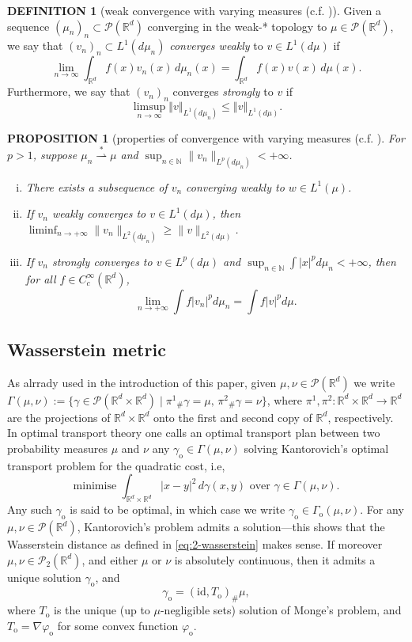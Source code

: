 \documentclass[11pt,leqno]{amsart}
\newtheorem{prop}[thm]{PROPOSITION}
\theoremstyle{definition}
\newtheorem{defi}[thm]{DEFINITION}
\newcommand{\bes}{\begin{equation*}}
\newcommand{\ees}{\end{equation*}}
\newcommand{\norm}[1]{\left\Vert#1\right\Vert}
\newcommand{\R}{{\mathord{\mathbb R}}}
\newcommand{\Rd}{{\mathord{\mathbb R}^d}}
\newcommand{\grad}{\nabla}
\newcommand{\wsto}{\stackrel{*}{\rightharpoonup}}
\def\P{{\mathcal P}}
\newcommand{\ird}{\int_{\mathord{\mathbb R}^d}}
\begin{document}
\begin{defi}[weak convergence with varying measures {(c.f. \cite[Definition 5.4.3]{AGS})}] \label{weakvaryingdef}
Given a sequence $(\mu_n)_n \subset \P(\Rd)$ converging in the weak-* topology to $\mu \in \P(\Rd)$, we say that $(v_n)_n \subset L^1(d \mu_n)$ \emph{converges weakly} to $v \in L^1(d \mu)$ if 
\bes
	\lim_{n\to\infty} \ird f(x) v_n(x) \,d\mu_n(x) = \ird f(x) v(x) \,d\mu(x).
\ees
Furthermore, we say that $(v_n)_n$ converges \emph{strongly} to $v$ if 
\bes
	\limsup_{n\to\infty} \norm{v}_{L^1(d\mu_n)} \leq \norm{v}_{L^1(d\mu)}.
\ees
\end{defi}

\begin{prop}[properties of convergence with varying measures {(c.f. \cite[Theorem 5.4.4]{AGS}}] \label{AGSthm}
For $p>1$, suppose $\mu_n \wsto \mu$ and  $\sup_{n \in \mathbb{N}} \| v_n\|_{L^p(d \mu_n)} <+\infty$.
\begin{enumerate}[(i)]
\item There exists a subsequence of $v_n$ converging weakly to $w \in L^1(\mu)$. \label{weakcpt}
\item If $v_n$ weakly converges to $v \in L^1(d \mu)$, then $\liminf_{n \to +\infty} \|v_n\|_{L^2(d \mu_n)} \geq \|v\|_{L^2(d \mu)}$. \label{weaklsc}
\item If $v_n$ strongly converges to $v \in L^p(d \mu)$ and $\sup_{n \in \mathbb{N}} \int |x|^p d \mu_n <+\infty$, then for all $f \in C^\infty_c(\Rd)$,
\[ \lim_{n \to +\infty} \int f |v_n|^p d \mu_n = \int f |v|^p d \mu . \] \label{strongcty}
\end{enumerate}
\end{prop}
\subsection{Wasserstein metric}

As alrrady used in the introduction of this paper, given $\mu,\nu\in\P(\R^d)$ we write $\Gamma(\mu,\nu) := \{\gamma \in\P(\R^d\times\R^d) \mid {\pi^1}_\# \gamma = \mu,\, {\pi^2}_\# \gamma = \nu\}$, where $\pi^1,\pi^2\colon \R^d \times \R^d \to \R^d$ are the projections of $\R^d\times \R^d$ onto the first and second copy of $\R^d$, respectively. In optimal transport theory one calls an optimal transport plan between two probability measures $\mu$ and $\nu$ any $\gamma_\mathrm{o} \in \Gamma(\mu,\nu)$ solving Kantorovich's optimal transport problem for the quadratic cost, i.e, 
\bes
	 \mbox{minimise  $\displaystyle \int_{\R^d\times \R^d} |x-y|^2 \,d\gamma(x,y)$ over $\gamma\in \Gamma(\mu,\nu)$}.
\ees
Any such $\gamma_\mathrm{o}$ is said to be optimal, in which case we write $\gamma_\mathrm{o} \in \Gamma_\mathrm{o}(\mu,\nu)$. For any $\mu,\nu\in\P(\R^d)$, Kantorovich's problem admits a solution---this shows that the Wasserstein distance as defined in \eqref{eq:2-wasserstein} makes sense. If moreover $\mu,\nu\in\P_2(\R^d)$, and either $\mu$ or $\nu$ is absolutely continuous, then it admits a unique solution $\gamma_\mathrm{o}$, and
\bes
	\gamma_\mathrm{o} = (\text{id},T_\mathrm{o})_\#\mu,
\ees
where $T_\mathrm{o}$ is the unique (up to $\mu$-negligible sets) solution of Monge's problem, and $T_\mathrm{o} = \grad \varphi_\mathrm{o}$ for some convex function $\varphi_\mathrm{o}$. 
\end{document}
